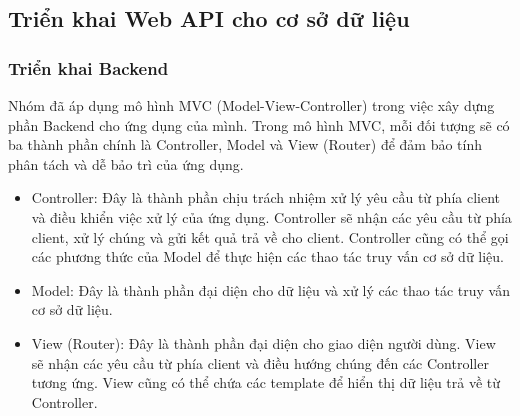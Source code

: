\subsection{Triển khai Web API cho cơ sở dữ liệu}

\subsubsection{Triển khai Backend}
Nhóm đã áp dụng mô hình MVC (Model-View-Controller) trong việc xây dựng phần Backend cho ứng dụng của mình. Trong mô hình MVC, mỗi đối tượng sẽ có ba thành phần chính là Controller, Model và View (Router) để đảm bảo tính phân tách và dễ bảo trì của ứng dụng.
\begin{itemize}
    \item Controller: Đây là thành phần chịu trách nhiệm xử lý yêu cầu từ phía client và điều khiển việc xử lý của ứng dụng. Controller sẽ nhận các yêu cầu từ phía client, xử lý chúng và gửi kết quả trả về cho client. Controller cũng có thể gọi các phương thức của Model để thực hiện các thao tác truy vấn cơ sở dữ liệu.
    \item Model: Đây là thành phần đại diện cho dữ liệu và xử lý các thao tác truy vấn cơ sở dữ liệu. 
    \item View (Router): Đây là thành phần đại diện cho giao diện người dùng. View sẽ nhận các yêu cầu từ phía client và điều hướng chúng đến các Controller tương ứng. View cũng có thể chứa các template để hiển thị dữ liệu trả về từ Controller.
\end{itemize}
